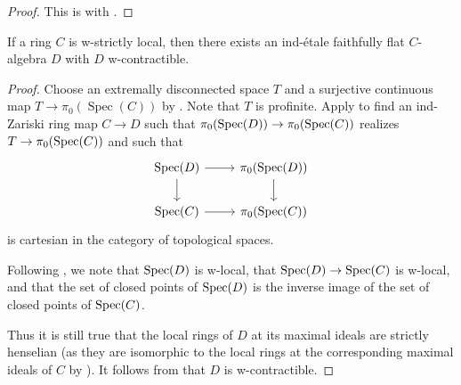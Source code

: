 \begin{proof}
  This is  with .
\end{proof}
  

\begin{lemma}
  If a ring \(C\) is w-strictly local, then there exists an ind-étale faithfully flat \(C\)-algebra \(D\) with \(D\) w-contractible.
  \label{thm:ind-etale-w-contractible-cover-of-w-strictly-local}
\end{lemma}

\begin{proof}
  Choose an extremally disconnected space $T$ and a surjective continuous map $T \to \pi_0(\operatorname{Spec}(C))$ by . Note that $T$ is profinite.
  Apply  to find an ind-Zariski ring map $C \to D$ such that $\pi_0(\operatorname{Spec} (D)) \to \pi_0(\operatorname{Spec} (C))$ realizes $T \to \pi_0(\operatorname{Spec} (C))$ and such that
  \[
  \begin{tikzcd}
  \operatorname{Spec}(D) \arrow[r] \arrow[d] & \pi_0(\operatorname{Spec}(D)) \arrow[d] \\
  \operatorname{Spec}(C) \arrow[r] & \pi_0(\operatorname{Spec}(C))
  \end{tikzcd}
  \]
  is cartesian in the category of topological spaces.

  Following , we note that $\operatorname{Spec} (D)$ is w-local, that $\operatorname{Spec} (D) \to \operatorname{Spec} (C)$ is w-local, and that the set of closed points of $\operatorname{Spec} (D)$ is the inverse image of the set of closed points of $\operatorname{Spec} (C)$.

  Thus it is still true that the local rings of $D$ at its maximal ideals are strictly henselian (as they are isomorphic to the local rings at the corresponding maximal ideals of $C$ by ). It follows from  that $D$ is w-contractible.
\end{proof}

